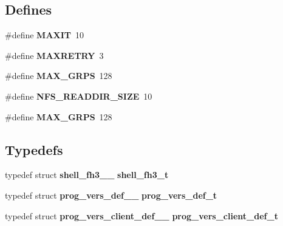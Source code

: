 \subsection*{Defines}
\begin{DoxyCompactItemize}
\item 
\#define {\bf MAXIT}~10
\item 
\#define {\bf MAXRETRY}~3
\item 
\#define {\bf MAX\_\-GRPS}~128
\item 
\#define {\bf NFS\_\-READDIR\_\-SIZE}~10
\item 
\#define {\bf MAX\_\-GRPS}~128
\end{DoxyCompactItemize}
\subsection*{Typedefs}
\begin{DoxyCompactItemize}
\item 
typedef struct {\bf shell\_\-fh3\_\-\_\-} {\bf shell\_\-fh3\_\-t}
\item 
typedef struct {\bf prog\_\-vers\_\-def\_\-\_\-} {\bf prog\_\-vers\_\-def\_\-t}
\item 
typedef struct {\bf prog\_\-vers\_\-client\_\-def\_\-\_\-} {\bf prog\_\-vers\_\-client\_\-def\_\-t}
\end{DoxyCompactItemize}
